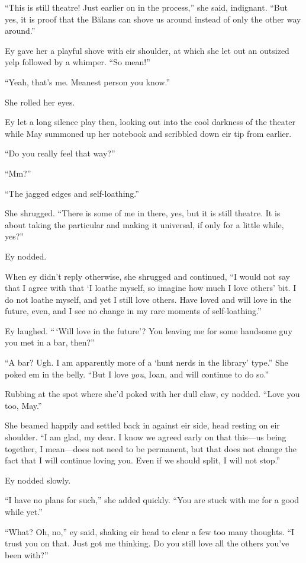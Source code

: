 ``This is still theatre! Just earlier on in the process,'' she said, indignant. ``But yes, it is proof that the Bălans can shove us around instead of only the other way around.''

Ey gave her a playful shove with eir shoulder, at which she let out an outsized yelp followed by a whimper. ``So mean!''

``Yeah, that's me. Meanest person you know.''

She rolled her eyes.

Ey let a long silence play then, looking out into the cool darkness of the theater while May summoned up her notebook and scribbled down eir tip from earlier.

``Do you really feel that way?''

``Mm?''

``The jagged edges and self-loathing.''

She shrugged. ``There is some of me in there, yes, but it is still theatre. It is about taking the particular and making it universal, if only for a little while, yes?''

Ey nodded.

When ey didn't reply otherwise, she shrugged and continued, ``I would not say that I agree with that `I loathe myself, so imagine how much I love others' bit. I do not loathe myself, and yet I still love others. Have loved and will love in the future, even, and I see no change in my rare moments of self-loathing.''

Ey laughed. ``\,`Will love in the future'? You leaving me for some handsome guy you met in a bar, then?''

``A bar? Ugh. I am apparently more of a `hunt nerds in the library' type.'' She poked em in the belly. ``But I love \emph{you}, Ioan, and will continue to do so.''

Rubbing at the spot where she'd poked with her dull claw, ey nodded. ``Love you too, May.''

She beamed happily and settled back in against eir side, head resting on eir shoulder. ``I am glad, my dear. I know we agreed early on that this—us being together, I mean—does not need to be permanent, but that does not change the fact that I will continue loving you. Even if we should split, I will not stop.''

Ey nodded slowly.

``I have no plans for such,'' she added quickly. ``You are stuck with me for a good while yet.''

``What? Oh, no,'' ey said, shaking eir head to clear a few too many thoughts. ``I trust you on that. Just got me thinking. Do you still love all the others you've been with?''

